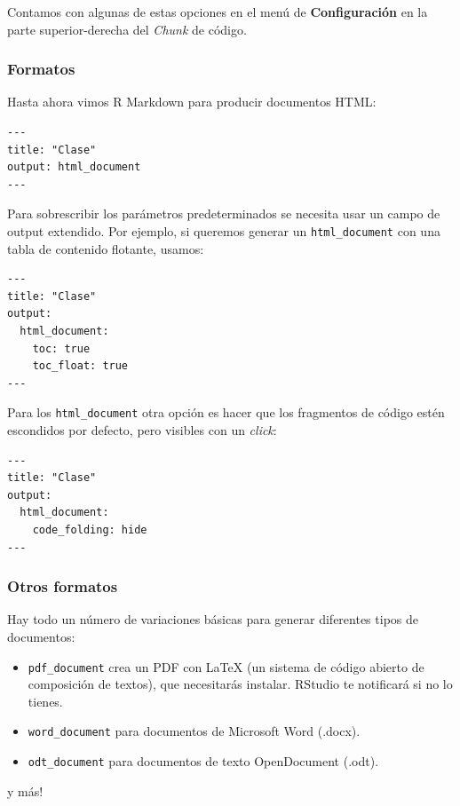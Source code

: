 \documentclass[
]{article}
\begin{document}
Contamos con algunas de estas opciones en el menú de
\textbf{Configuración} en la parte superior-derecha del \emph{Chunk} de
código.

\subsubsection{Formatos}\label{formatos}

Hasta ahora vimos R Markdown para producir documentos HTML:

\begin{verbatim}
---
title: "Clase"  
output: html_document
---
\end{verbatim}

Para sobrescribir los parámetros predeterminados se necesita usar un
campo de output extendido. Por ejemplo, si queremos generar un
\texttt{html\_document} con una tabla de contenido flotante, usamos:

\begin{verbatim}
---
title: "Clase"
output:
  html_document:
    toc: true
    toc_float: true
---
\end{verbatim}

Para los \texttt{html\_document} otra opción es hacer que los fragmentos
de código estén escondidos por defecto, pero visibles con un
\emph{click}:

\begin{verbatim}
---
title: "Clase"
output:
  html_document:
    code_folding: hide
---
\end{verbatim}

\subsubsection{Otros formatos}\label{otros-formatos}

Hay todo un número de variaciones básicas para generar diferentes tipos
de documentos:

\begin{itemize}
\item
  \texttt{pdf\_document} crea un PDF con LaTeX (un sistema de código
  abierto de composición de textos), que necesitarás instalar. RStudio
  te notificará si no lo tienes.
\item
  \texttt{word\_document} para documentos de Microsoft Word (.docx).
\item
  \texttt{odt\_document} para documentos de texto OpenDocument (.odt).
\end{itemize}

y más!
\end{document}
